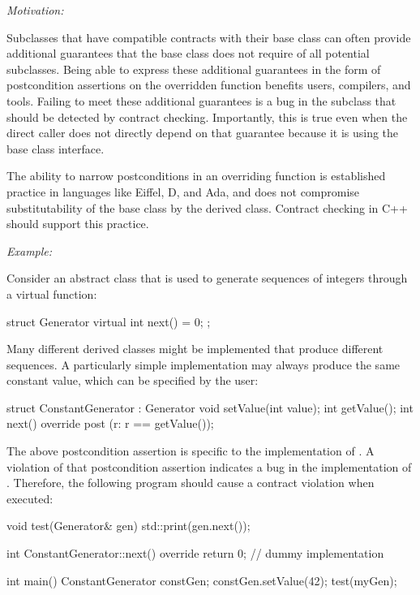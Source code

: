 \emph{Motivation:}

Subclasses that have compatible contracts with their base class can often provide additional guarantees that the base class does not require of all potential subclasses. Being able to express these additional guarantees in the form of postcondition assertions on the overridden function benefits users, compilers, and tools. Failing to meet these additional guarantees is a bug in the subclass that should be detected by contract checking. Importantly, this is true even when the direct caller does not directly depend on that guarantee because it is using the base class interface.

The ability to narrow postconditions in an overriding function is established practice in languages like Eiffel, D, and Ada, and does not compromise substitutability of the base class by the derived class. Contract checking in C++ should support this practice.

\emph{Example:}

Consider an abstract class that is used to generate sequences of integers through a virtual function:

\begin{codeblock}
struct Generator {
  virtual int next() = 0;
};
\end{codeblock}
Many different derived classes might be implemented that produce different sequences. A particularly simple implementation may always produce the same constant value, which can be specified by the user:
\begin{codeblock}
struct ConstantGenerator : Generator {
  void setValue(int value);
  int getValue(); 
  int next() override
    post (r: r == getValue());
}
\end{codeblock}
The above postcondition assertion is specific to the implementation of \allowbreak{}. A violation of that postcondition assertion indicates a bug in the implementation of . Therefore, the following program should cause a contract violation when executed:
\begin{codeblock}
void test(Generator& gen) {
  std::print(gen.next());
}

int ConstantGenerator::next() override {
  return 0;  // dummy implementation  
} 

int main() {
  ConstantGenerator constGen;
  constGen.setValue(42);
  test(myGen);
}
\end{codeblock}



